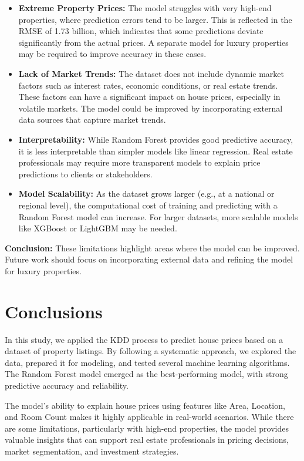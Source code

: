 \documentclass{article}
\begin{document}
\begin{itemize}
    \item \textbf{Extreme Property Prices:} The model struggles with very high-end properties, where prediction errors tend to be larger. This is reflected in the RMSE of 1.73 billion, which indicates that some predictions deviate significantly from the actual prices. A separate model for luxury properties may be required to improve accuracy in these cases.
    \item \textbf{Lack of Market Trends:} The dataset does not include dynamic market factors such as interest rates, economic conditions, or real estate trends. These factors can have a significant impact on house prices, especially in volatile markets. The model could be improved by incorporating external data sources that capture market trends.
    \item \textbf{Interpretability:} While Random Forest provides good predictive accuracy, it is less interpretable than simpler models like linear regression. Real estate professionals may require more transparent models to explain price predictions to clients or stakeholders.
    \item \textbf{Model Scalability:} As the dataset grows larger (e.g., at a national or regional level), the computational cost of training and predicting with a Random Forest model can increase. For larger datasets, more scalable models like XGBoost or LightGBM
may be needed.
\end{itemize}

\textbf{Conclusion:} These limitations highlight areas where the model can be improved. Future work should focus on incorporating external data and refining the model for luxury properties.

\section{Conclusions}
In this study, we applied the KDD process to predict house prices based on a dataset of property listings. By following a systematic approach, we explored the data, prepared it for modeling, and tested several machine learning algorithms. The Random Forest model emerged as the best-performing model, with strong predictive accuracy and reliability.

The model’s ability to explain house prices using features like Area, Location, and Room Count makes it highly applicable in real-world scenarios. While there are some limitations, particularly with high-end properties, the model provides valuable insights that can support real estate professionals in pricing decisions, market segmentation, and investment strategies.
\end{document}
